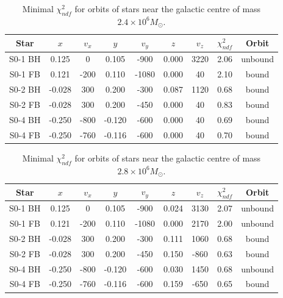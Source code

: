 \begin{table}[!p]
	\begin{center}
	\begin{tabular}{c c c c c c c c c}
	\hline
	\hline
	Star & $x$ & $v_x$ & $y$ & $v_y$ & $z$ & $v_z$ & $\chi^2_{ndf}$ & Orbit \\
	\hline
	S0-1 BH &  0.125 & 0    & 0.105  & -900  & 0.000 & 3220  & 2.06 & unbound \\
	S0-1 FB &  0.121 & -200 & 0.110  & -1080 & 0.000 & 40    & 2.10 & bound \\
	S0-2 BH & -0.028 & 300  & 0.200  & -300  & 0.087 & 1120  & 0.68 & bound \\
	S0-2 FB & -0.028 & 300  & 0.200  & -450  & 0.000 & 40    & 0.83 & bound \\
	S0-4 BH & -0.250 & -800 & -0.120 & -600  & 0.000 & 40    & 0.69 & bound \\
	S0-4 FB & -0.250 & -760 & -0.116 & -600  & 0.000 & 40    & 0.70 & bound \\
	\hline
	\end{tabular}
	\end{center}
	\caption{Minimal $\chi^2_{ndf}$ for orbits of stars near the galactic centre of mass $2.4 \times 10^6 M_\odot$.}
	\label{tab_minimalzvzchisquareminmass}
\end{table}
\begin{table}[!p]
	\begin{center}
	\begin{tabular}{c c c c c c c c c}
	\hline
	\hline
	Star & $x$ & $v_x$ & $y$ & $v_y$ & $z$ & $v_z$ & $\chi^2_{ndf}$ & Orbit \\
	\hline
	S0-1 BH &  0.125 & 0    & 0.105  & -900  & 0.024 & 3130  & 2.07 & unbound \\
	S0-1 FB &  0.121 & -200 & 0.110  & -1080 & 0.000 & 2170  & 2.00 & unbound \\
	S0-2 BH & -0.028 & 300  & 0.200  & -300  & 0.111 & 1060  & 0.68 & bound \\
	S0-2 FB & -0.028 & 300  & 0.200  & -450  & 0.150 & -860  & 0.63 & bound \\
	S0-4 BH & -0.250 & -800 & -0.120 & -600  & 0.030 & 1450  & 0.68 & unbound \\
	S0-4 FB & -0.250 & -760 & -0.116 & -600  & 0.159 & -650  & 0.65 & bound \\
	\hline
	\end{tabular}
	\end{center}
	\caption{Minimal $\chi^2_{ndf}$ for orbits of stars near the galactic centre of mass $2.8 \times 10^6 M_\odot$.}
	\label{tab_minimalzvzchisquaremaxmass}
\end{table}
